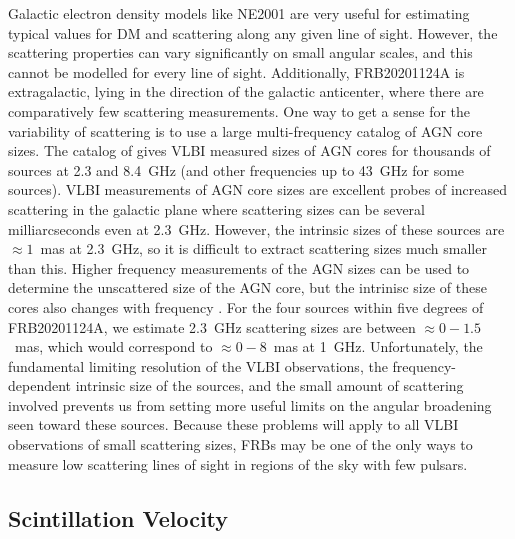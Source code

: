 \documentclass[fleqn,usenatbib]{mnras}
\newcommand{\frb}{FRB20201124A}
\begin{document}
Galactic electron density models like NE2001 are very useful for estimating 
typical values for DM and scattering along any given line of sight.  However, 
the scattering properties can vary significantly on small angular scales, and 
this cannot be modelled for every line of sight.  Additionally, {\frb} is extragalactic, lying in the direction of the galactic anticenter, where there are comparatively few scattering measurements. %
One way to get a sense for 
the variability of scattering is to use a large multi-frequency catalog of 
AGN core sizes.  The catalog of \citet{pushkarev+15} gives VLBI measured 
sizes of AGN cores for thousands of sources at 2.3 and 8.4~GHz (and other 
frequencies up to 43~GHz for some sources).  VLBI measurements of AGN 
core sizes are excellent probes of increased scattering in the galactic plane where 
scattering sizes can be several milliarcseconds even at 2.3~GHz.  However, 
the intrinsic sizes of these sources are $\approx1$~mas at 2.3~GHz, so it is 
difficult to extract scattering sizes much smaller than this.  Higher 
frequency measurements of the AGN sizes can be used to determine the 
unscattered size of the AGN core, but the intrinisc size of these 
cores also changes with frequency \citep{pushkarev+15}.  
For the four sources within five degrees of {\frb}, we estimate 2.3~GHz scattering 
sizes are between $\approx 0-1.5$~mas, which would correspond to 
$\approx 0-8$~mas at 1~GHz.  Unfortunately, the fundamental limiting resolution 
of the VLBI observations, the frequency-dependent intrinsic size of the sources, 
and the small amount of scattering involved prevents us from setting more useful 
limits on the angular broadening seen toward these sources.  Because these 
problems will apply to all VLBI observations of small scattering sizes, FRBs may 
be one of the only ways to measure low scattering lines of sight in regions of the 
sky with few pulsars.


\subsection{Scintillation Velocity}
\end{document}
